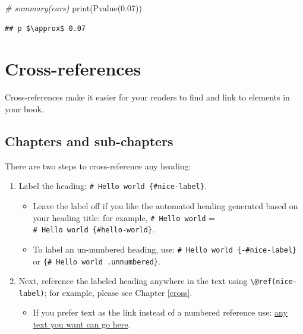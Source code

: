 \documentclass[
  12pt,
  twoside]{book}
\newenvironment{Shaded}{\begin{snugshade}}{\end{snugshade}}
\newcommand{\CommentTok}[1]{\textcolor[rgb]{0.56,0.35,0.01}{\textit{#1}}}
\newcommand{\FloatTok}[1]{\textcolor[rgb]{0.00,0.00,0.81}{#1}}
\newcommand{\FunctionTok}[1]{\textcolor[rgb]{0.00,0.00,0.00}{#1}}
\newcommand{\NormalTok}[1]{#1}
\providecommand{\tightlist}{%
  \setlength{\itemsep}{0pt}\setlength{\parskip}{0pt}}
\theoremstyle{definition}
\theoremstyle{definition}
\theoremstyle{definition}
\theoremstyle{definition}
\theoremstyle{remark}
\begin{document}
\begin{Shaded}
\begin{Highlighting}[]
\CommentTok{\# summary(cars)}
\FunctionTok{print}\NormalTok{(}\FunctionTok{Pvalue}\NormalTok{(}\FloatTok{0.07}\NormalTok{))}
\end{Highlighting}
\end{Shaded}

\begin{verbatim}
## p $\approx$ 0.07
\end{verbatim}

\hypertarget{cross}{%
\chapter*{Cross-references}\label{cross}}

Cross-references make it easier for your readers to find and link to elements in your book.

\hypertarget{chapters-and-sub-chapters}{%
\section{Chapters and sub-chapters}\label{chapters-and-sub-chapters}}

There are two steps to cross-reference any heading:

\begin{enumerate}
\def\labelenumi{\arabic{enumi}.}
\tightlist
\item
  Label the heading: \texttt{\#\ Hello\ world\ \{\#nice-label\}}.

  \begin{itemize}
  \tightlist
  \item
    Leave the label off if you like the automated heading generated based on your heading title: for example, \texttt{\#\ Hello\ world} = \texttt{\#\ Hello\ world\ \{\#hello-world\}}.
  \item
    To label an un-numbered heading, use: \texttt{\#\ Hello\ world\ \{-\#nice-label\}} or \texttt{\{\#\ Hello\ world\ .unnumbered\}}.
  \end{itemize}
\item
  Next, reference the labeled heading anywhere in the text using \texttt{\textbackslash{}@ref(nice-label)}; for example, please see Chapter \ref{cross}.

  \begin{itemize}
  \tightlist
  \item
    If you prefer text as the link instead of a numbered reference use: \protect\hyperlink{cross}{any text you want can go here}.
  \end{itemize}
\end{enumerate}
\end{document}
